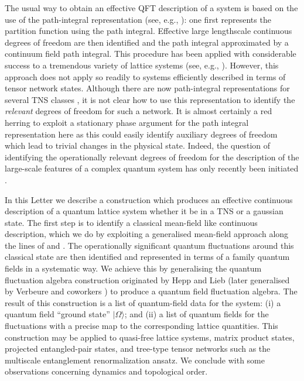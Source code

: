\documentclass[prl,twocolumn,lengthcheck,superscriptaddress]{revtex4-1}
\theoremstyle{definition}
\theoremstyle{remark}
\begin{document}
The usual way to obtain an effective QFT description of a system is based on the use of the path-integral representation (see, e.g., \cite{wilson:1975a, auerbach:1994a}): one first represents the partition function using the path integral. Effective large lengthscale continuous degrees of freedom are then identified and the path integral approximated by a continuum field path integral. This procedure has been applied with considerable success to a tremendous variety of lattice systems (see, e.g., \cite{sachdev:2011a, fradkin:2013a}). However, this approach does not apply so readily to systems efficiently described in terms of tensor network states. Although there are now path-integral representations for several TNS classes \cite{brockt:2012a, jennings:2012a}, it is not clear how to use this representation to identify the \emph{relevant} degrees of freedom for such a network. It is almost certainly a red herring to exploit a stationary phase argument for the path integral representation here as this could easily identify auxiliary degrees of freedom which lead to trivial changes in the physical state. Indeed, the question of identifying the operationally relevant degrees of freedom for the description of the large-scale features of a complex quantum system has only recently been initiated \cite{beny:2013a}.   

In this Letter we describe a construction which produces an effective continuous description of a quantum lattice system whether it be in a TNS or a gaussian state. The first step is to identify a classical mean-field like continuous description, which we do by exploiting a generalised mean-field approach along the lines of \cite{verbeure:2011a} and \cite{raggio:1989a,raggio:1991a}. The operationally significant quantum fluctuations around this classical state are then identified and represented in terms of a family quantum fields in a systematic way. We achieve this by generalising the quantum fluctuation algebra construction originated by Hepp and Lieb \cite{hepp:1973b} (later generalised by Verbeure and coworkers  \cite{goderis:1989d,goderis:1989c,goderis:1990b,goderis:1989b,goderis:1990a,goderis:1988a,goderis:1989a,michoel:1998a,requardt:2002a, verbeure:2011a}) to produce a quantum field fluctuation algebra. The result of this construction is a list of quantum-field data for the system: (i) a quantum field ``ground state'' $|\Omega\rangle$; and (ii) a list of quantum fields for the fluctuations with a precise map to the corresponding lattice quantities. This construction may be applied to quasi-free lattice systems, matrix product states, projected entangled-pair states, and tree-type tensor networks such as the multiscale entanglement renormalization ansatz. We conclude with some observations concerning dynamics and topological order.
\end{document}
